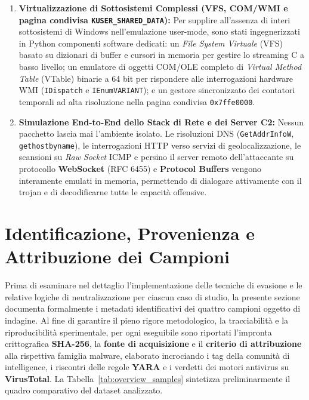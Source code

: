 \documentclass[11pt, a4paper]{article}
\begin{document}
\begin{enumerate}
	\item \textbf{Virtualizzazione di Sottosistemi Complessi (VFS, COM/WMI e pagina condivisa \texttt{KUSER\_\allowbreak{}SHARED\_\allowbreak{}DATA}):} Per supplire all'assenza di interi sottosistemi di Windows nell'emulazione user-mode, sono stati ingegnerizzati in Python componenti software dedicati: un \textit{File System Virtuale} (VFS) basato su dizionari di buffer e cursori in memoria per gestire lo streaming C a basso livello; un emulatore di oggetti COM/OLE completo di \textit{Virtual Method Table} (VTable) binarie a 64 bit per rispondere alle interrogazioni hardware WMI (\texttt{IDispatch} e \texttt{IEnumVARIANT}); e un gestore sincronizzato dei contatori temporali ad alta risoluzione nella pagina condivisa \texttt{0x7ffe0000}.
	
	\item \textbf{Simulazione End-to-End dello Stack di Rete e dei Server C2:} Nessun pacchetto lascia mai l'ambiente isolato. Le risoluzioni DNS (\texttt{GetAddrInfoW}, \texttt{gethostbyname}), le interrogazioni HTTP verso servizi di geolocalizzazione, le scansioni su \textit{Raw Socket} ICMP e persino il server remoto dell'attaccante su protocollo \textbf{WebSocket} (RFC 6455) e \textbf{Protocol Buffers} vengono interamente emulati in memoria, permettendo di dialogare attivamente con il trojan e di decodificarne tutte le capacit\`a offensive.
\end{enumerate}

\section{Identificazione, Provenienza e Attribuzione dei Campioni}

Prima di esaminare nel dettaglio l'implementazione delle tecniche di evasione e le relative logiche di neutralizzazione per ciascun caso di studio, la presente sezione documenta formalmente i metadati identificativi dei quattro campioni oggetto di indagine. Al fine di garantire il pieno rigore metodologico, la tracciabilit\`a e la riproducibilit\`a sperimentale, per ogni eseguibile sono riportati l'impronta crittografica \textbf{SHA-256}, la \textbf{fonte di acquisizione} e il \textbf{criterio di attribuzione} alla rispettiva famiglia malware, elaborato incrociando i tag della comunit\`a di intelligence, i riscontri delle regole \textbf{YARA} e i verdetti dei motori antivirus su \textbf{VirusTotal}. La Tabella~\ref{tab:overview_samples} sintetizza preliminarmente il quadro comparativo del dataset analizzato.
\end{document}
